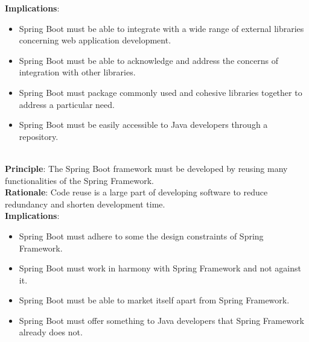\textbf{Implications}: 
\begin{itemize}
\item Spring Boot must be able to integrate with a wide range of external libraries concerning web application development.
\item Spring Boot must be able to acknowledge and address the concerns of integration with other libraries.
\item Spring Boot must package commonly used and cohesive libraries together to address a particular need.
\item Spring Boot must be easily accessible to Java developers through a repository.
\end{itemize}

\noindent\makebox[\linewidth]{\rule{\textwidth}{3pt}}\ \\

\textbf{Principle}: The Spring Boot framework must be developed by reusing many functionalities of the Spring Framework.\\

\textbf{Rationale}: Code reuse is a large part of developing software to reduce redundancy and shorten development time.\\

\textbf{Implications}: 
\begin{itemize}
\item Spring Boot must adhere to some the design constraints of Spring Framework.
\item Spring Boot must work in harmony with Spring Framework and not against it.
\item Spring Boot must be able to market itself apart from Spring Framework.
\item Spring Boot must offer something to Java developers that Spring Framework already does not.
\end{itemize}

\noindent\makebox[\linewidth]{\rule{\textwidth}{3pt}}
